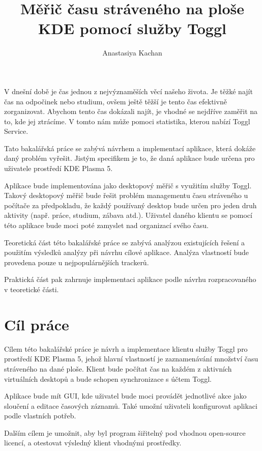 \documentclass[thesis=B,czech]{FITthesis}[2012/06/26]
\title{Měřič času stráveného na ploše KDE pomocí služby Toggl}
\author{Anastasiya Kachan} %
\begin{document}

\begin{introduction}
	V dnešní době je čas jednou z nejvýznaměších věcí našeho života. Je těžké najít čas na odpočinek nebo studium, ovšem ještě těžší je tento čas efektivně zorganizovat. Abychom tento čas dokázali najít, je vhodné se nejdříve zaměřit na to, kde jej ztrácíme. V tomto nám může pomoci statistika, kterou nabízí Toggl Service.
	\par 
	Tato bakalářská práce se zabývá návrhem a implementací aplikace, která dokáže daný problém vyřešit. Jistým specifikem je to, že daná aplikace bude určena pro uživatele prostředí KDE Plasma 5.
	\par
	Aplikace bude implementována jako desktopový měřič s využitím služby Toggl. Takový desktopový měřič bude řešit problém managementu času stráveného u počítače za předpokladu, že každý používaný desktop bude určen pro jeden druh aktivity (např. práce, studium, zábava atd.). Uživatel daného klientu se pomocí této aplikace bude moci poté zamyslet nad organizací svého času.
	\par
	Teoretická část této bakalářské práce se zabývá analýzou existujících řešení a použitím výsledků analýzy při návrhu cílové aplikace. Analýza vlastností bude provedena pouze u nejpopulárnějších trackerů. \par Praktická část pak zahrnuje implementaci aplikace podle návrhu rozpracovaného v teoretické části.
	
\end{introduction}

\chapter{Cíl práce}
	Cílem této bakalářské práce je návrh a implementace klientu služby Toggl pro prostředí KDE Plasma 5, jehož hlavní vlastností je zaznamenávání množství času stráveného na dané ploše. Klient bude počítat čas na každém z aktivních virtuálních desktopů a bude schopen synchronizace s účtem Toggl.
	\par
	Aplikace bude mít GUI, kde uživatel bude moci provádět jednotlivé akce jako sloučení a editace časových záznamů. Také umožní uživateli konfigurovat aplikaci podle vlastních potřeb. 
	\par
	Dalším cílem je umožnit, aby byl program šiřitelný pod vhodnou open-source licencí, a otestovat výsledný klient vhodnými prostředky.
\end{document}
